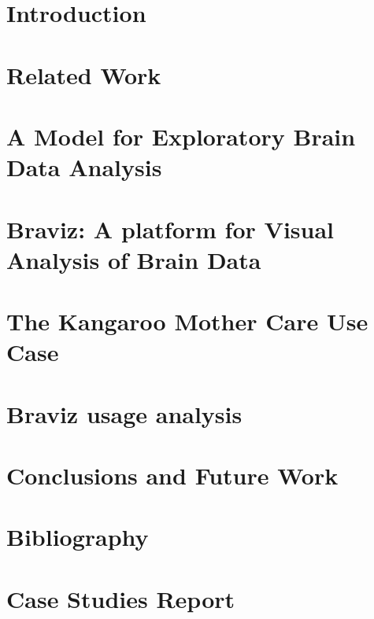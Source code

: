\documentclass[12pt]{report}
\begin{document}
\tableofcontents

\chapter{Introduction}
\label{chap_intro}


\chapter{Related Work}
\label{chap_related}


\chapter{A Model for Exploratory Brain Data Analysis}
\label{chap_model}


\chapter{Braviz: A platform for Visual Analysis of Brain Data}
\label{chap_braviz}


\chapter{The Kangaroo Mother Care Use Case}
\label{chap_kmc}


\chapter{Braviz usage analysis}
\label{chap_analysis}


\chapter{Conclusions and Future Work}
\label{chap_conclusions}


\chapter*{Bibliography}
\printbibliography

\appendix
\chapter{Case Studies Report}


%
\end{document}
